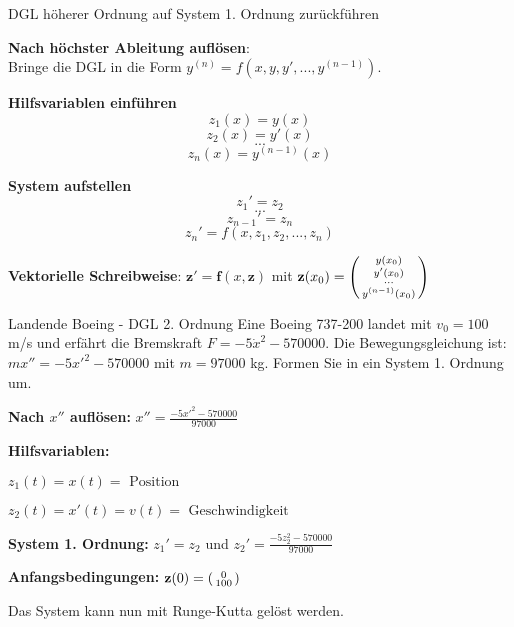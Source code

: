 \begin{KR}{DGL höherer Ordnung auf System 1. Ordnung zurückführen}

\textbf{Nach höchster Ableitung auflösen}:\\
Bringe die DGL in die Form $y^{(n)} = f(x, y, y', ..., y^{(n-1)})$.
\vspace{2mm}\\
\begin{minipage}{0.4\linewidth}
\textbf{Hilfsvariablen einführen}
\small
$$z_1(x) = y(x)$$
$$z_2(x) = y'(x)$$
$$...$$
$$z_n(x) = y^{(n-1)}(x)$$
\end{minipage}
\hspace{2mm}
\begin{minipage}{0.4\linewidth}
\textbf{System aufstellen}
 \small
$$z_1' = z_2$$
$$...$$
$$z_{n-1}' = z_n$$
$$z_n' = f(x, z_1, z_2, ..., z_n)$$
\end{minipage}

\textbf{Vektorielle Schreibweise}:
$\mathbf{z}' = \mathbf{f}(x, \mathbf{z})$ mit $\mathbf{z}(x_0) = \begin{psmallmatrix} y(x_0) \\ y'(x_0) \\ \cdots \\ y^{(n-1)}(x_0) \end{psmallmatrix}$
\end{KR}

\begin{example2}{Landende Boeing - DGL 2. Ordnung}
Eine Boeing 737-200 landet mit $v_0 = 100$ m/s und erfährt die Bremskraft $F = -5\dot{x}^2 - 570000$. Die Bewegungsgleichung ist:
$mx'' = -5{x'}^2 - 570000$
mit $m = 97000$ kg. Formen Sie in ein System 1. Ordnung um.

\textbf{Nach $x''$ auflösen:}
$x'' = \frac{-5{x'}^2 - 570000}{97000}$

\textbf{Hilfsvariablen:}

$z_1(t) = x(t) = \text{ Position}$ 

$z_2(t) = x'(t) = v(t) = \text{ Geschwindigkeit}$

\textbf{System 1. Ordnung:} $z_1' = z_2$ und
$z_2' = \frac{-5z_2^2 - 570000}{97000}$

\textbf{Anfangsbedingungen:} $\mathbf{z}(0) = \begin{psmallmatrix} 0 \\ 100 \end{psmallmatrix}$

Das System kann nun mit Runge-Kutta gelöst werden.
\end{example2}


